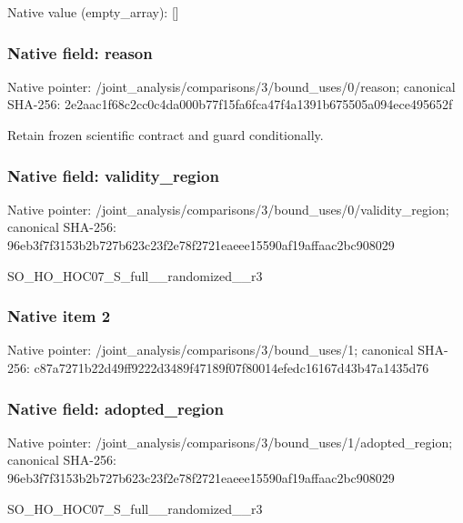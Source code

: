 \documentclass[10pt,a4paper]{article}
\begin{document}
Native value (empty\_\allowbreak{}array): []

\subsubsection{Native field: reason}
Native pointer: /joint\_\allowbreak{}analysis/comparisons/3/bound\_\allowbreak{}uses/0/reason; canonical SHA-256: 2e2aac1f68c2cc0c4da000b77f15fa6fca47f4a1391b675505a094ece495652f

\begingroup\raggedright\sloppy Retain frozen scientific contract and guard conditionally.\par\endgroup

\subsubsection{Native field: validity\_\allowbreak{}region}
Native pointer: /joint\_\allowbreak{}analysis/comparisons/3/bound\_\allowbreak{}uses/0/validity\_\allowbreak{}region; canonical SHA-256: 96eb3f7f3153b2b727b623c23f2e78f2721eaeee15590af19affaac2bc908029

\begingroup\raggedright\sloppy SO\_\allowbreak{}HO\_\allowbreak{}HOC07\_\allowbreak{}S\_\allowbreak{}full\_\allowbreak{}\_\allowbreak{}randomized\_\allowbreak{}\_\allowbreak{}r3\par\endgroup

\subsubsection{Native item 2}
Native pointer: /joint\_\allowbreak{}analysis/comparisons/3/bound\_\allowbreak{}uses/1; canonical SHA-256: c87a7271b22d49ff9222d3489f47189f07f80014efedc16167d43b47a1435d76

\subsubsection{Native field: adopted\_\allowbreak{}region}
Native pointer: /joint\_\allowbreak{}analysis/comparisons/3/bound\_\allowbreak{}uses/1/adopted\_\allowbreak{}region; canonical SHA-256: 96eb3f7f3153b2b727b623c23f2e78f2721eaeee15590af19affaac2bc908029

\begingroup\raggedright\sloppy SO\_\allowbreak{}HO\_\allowbreak{}HOC07\_\allowbreak{}S\_\allowbreak{}full\_\allowbreak{}\_\allowbreak{}randomized\_\allowbreak{}\_\allowbreak{}r3\par\endgroup
\end{document}
